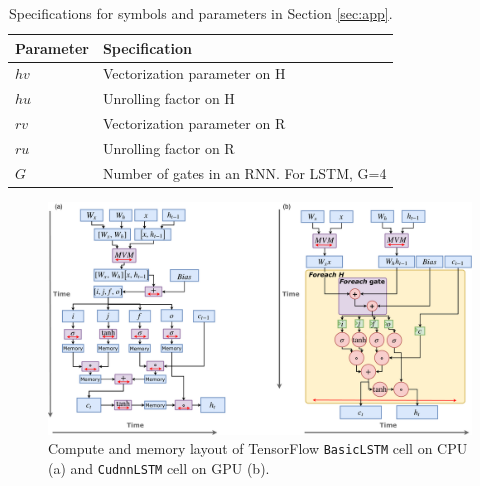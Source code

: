 \begin{table}[t]
\begin{tabular}{p{0.6cm}m{3cm}m{3cm}}
    \midrule
    \midrule
    Parameter & \multicolumn{2}{l}{Specification} \\
    \midrule
    $hv$      & \multicolumn{2}{l}{Vectorization parameter on H} \\
    $hu$      & \multicolumn{2}{l}{Unrolling factor on H} \\
    $rv$      & \multicolumn{2}{l}{Vectorization parameter on R} \\
    $ru$      & \multicolumn{2}{l}{Unrolling factor on R} \\
    $G$       & \multicolumn{2}{l}{Number of gates in an RNN. For LSTM, G=4} \\
  \bottomrule
  \end{tabular}
  \caption{Specifications for symbols and parameters in Section \ref{sec:app}.}
  \label{tab:legend_app}
  \vskip -0.1in
  \end{table}

\begin{figure}
  \centering
  \includegraphics[width=1.5\columnwidth]{figs/cpugpulstm.pdf}
  \caption{Compute and memory layout of TensorFlow \texttt{BasicLSTM} cell on CPU (a) and \texttt{CudnnLSTM} cell on GPU (b).}\label{fig:tf_lstm}
\end{figure}

